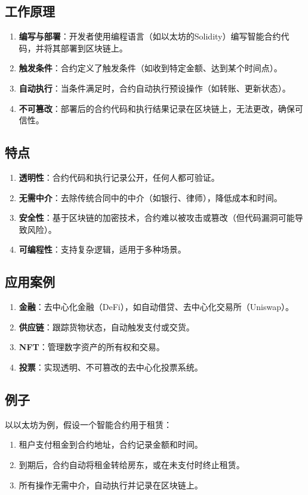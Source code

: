 \documentclass[12pt]{ctexart}
\begin{document}
\subsection{工作原理}
\begin{enumerate}
    \item \textbf{编写与部署}：开发者使用编程语言（如以太坊的Solidity）编写智能合约代码，并将其部署到区块链上。
    \item \textbf{触发条件}：合约定义了触发条件（如收到特定金额、达到某个时间点）。
    \item \textbf{自动执行}：当条件满足时，合约自动执行预设操作（如转账、更新状态）。
    \item \textbf{不可篡改}：部署后的合约代码和执行结果记录在区块链上，无法更改，确保可信性。
\end{enumerate}

\subsection{特点}
\begin{enumerate}
    \item \textbf{透明性}：合约代码和执行记录公开，任何人都可验证。
    \item \textbf{无需中介}：去除传统合同中的中介（如银行、律师），降低成本和时间。
    \item \textbf{安全性}：基于区块链的加密技术，合约难以被攻击或篡改（但代码漏洞可能导致风险）。
    \item \textbf{可编程性}：支持复杂逻辑，适用于多种场景。
\end{enumerate}

\subsection{应用案例}
\begin{enumerate}
    \item \textbf{金融}：去中心化金融（DeFi），如自动借贷、去中心化交易所（Uniswap）。
    \item \textbf{供应链}：跟踪货物状态，自动触发支付或交货。
    \item \textbf{NFT}：管理数字资产的所有权和交易。
    \item \textbf{投票}：实现透明、不可篡改的去中心化投票系统。
\end{enumerate}

\subsection{例子}
以以太坊为例，假设一个智能合约用于租赁：
\begin{enumerate}
    \item 租户支付租金到合约地址，合约记录金额和时间。
    \item 到期后，合约自动将租金转给房东，或在未支付时终止租赁。
    \item 所有操作无需中介，自动执行并记录在区块链上。
\end{enumerate}
\end{document}
